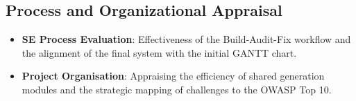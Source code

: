 \subsection{Process and Organizational Appraisal}
\begin{itemize}
\item \textbf{SE Process Evaluation}: Effectiveness of the Build-Audit-Fix workflow and the alignment of the final system with the initial GANTT chart.
\item \textbf{Project Organisation}: Appraising the efficiency of shared generation modules and the strategic mapping of challenges to the OWASP Top 10.
\end{itemize}
